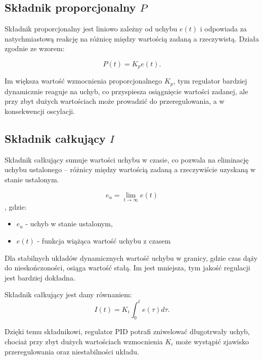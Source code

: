\subsection{Składnik proporcjonalny $P$}

Składnik proporcjonalny jest liniowo zależny od uchybu $e(t)$ i odpowiada za natychmiastową reakcję na różnicę między wartością zadaną a rzeczywistą. Działa zgodnie ze wzorem:

\begin{equation}
P(t) = K_p e(t) .
\end{equation}

Im większa wartość wzmocnienia proporcjonalnego $K_p$, tym regulator bardziej dynamicznie reaguje na uchyb, co przyspiesza osiągnięcie wartości zadanej, ale przy zbyt dużych wartościach może prowadzić do przeregulowania, a w konsekwencji oscylacji.

\subsection{Składnik całkujący $I$}

Składnik całkujący sumuje wartości uchybu w czasie, co pozwala na eliminację uchybu ustalonego – różnicy między wartością zadaną a rzeczywiście uzyskaną w stanie ustalonym.

\begin{equation}
    e_u = \lim_{t \to \infty} e(t)
    \label{eq:lim_stab}
\end{equation}
, gdzie:
\begin{itemize}
    \item $e_u$ - uchyb w stanie ustalonym,
    \item $e(t)$ - funkcja wiążąca wartość uchybu z czasem
\end{itemize}

Dla stabilnych układów dynamicznych wartość uchybu w granicy, gdzie czas dąży do nieskończoności, osiąga wartość stałą. Im jest mniejsza, tym jakość regulacji jest bardziej dokładna. 

\hspace{1cm}

Składnik całkujący jest dany równaniem:
\begin{equation}
I(t) = K_i \int_{0}^{t} e(\tau) d\tau .
\end{equation}

Dzięki temu składnikowi, regulator PID potrafi zniwelować długotrwały uchyb, chociaż przy zbyt dużych wartościach wzmocnienia $K_i$ może wystąpić zjawisko przeregulowania oraz niestabilności układu.

